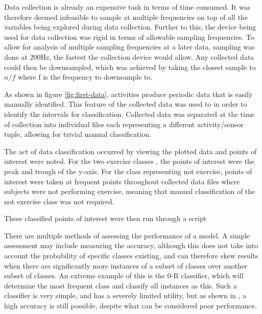 Data collection is already an expensive task in terms of time consumed. It was therefore deemed infeasible to sample at multiple frequencies on top of all the variables being explored during data collection. Further to this, the device being used for data collection was rigid in terms of allowable sampling frequencies. To allow for analysis of multiple sampling frequencies at a later data, sampling was done at 200Hz, the fastest the collection device would allow. Any collected data could then be downsampled, which was achieved by taking the closest sample to $n/f$ where f is the frequency to downsample to.

As shown in figure \ref{fig:first-data}, activities produce periodic data that is easily manually identified. This feature of the collected data was used to in order to identify the intervals for classification. Collected data was separated at the time of collection into individual files each representing a different activity/sensor tuple, allowing for trivial manual classification.

The act of data classification occurred by viewing the plotted data and points of interest were noted. For the two exercise classes , the points of interest were the peak and trough of the y-axis. For the class representing not exercise, points of interest were taken at frequent points throughout collected data files where subjects were not performing exercise, meaning that manual classification of the not exercise class was not required.

These classified points of interest were then run through a script 

There are multiple methods of assessing the performance of a model. A simple assessment may include measuring the accuracy, although this does not take into account the probability of specific classes existing, and can therefore skew results when there are significantly more instances of a subset of classes over another subset of classes. An extreme example of this is the 0-R classifier, which will determine the most frequent class and classify all instances as this. Such a classifier is very simple, and has a severely limited utility, but as shown in , a high accuracy is still possible, despite what can be considered poor performance.

